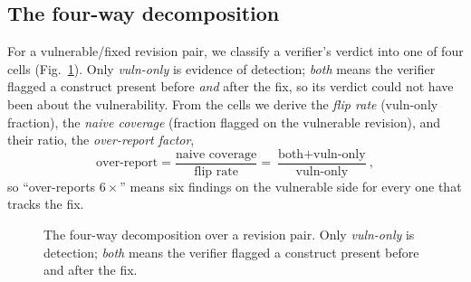 \documentclass[conference]{IEEEtran}
\begin{document}
\subsection{The four-way decomposition}
For a vulnerable/fixed revision pair, we classify a verifier's verdict into one of
four cells (Fig.~\ref{fig:cells}). Only \emph{vuln-only} is evidence of detection;
\emph{both} means the verifier flagged a construct present before \emph{and} after
the fix, so its verdict could not have been about the vulnerability. From the cells
we derive the \emph{flip rate} (vuln-only fraction), the \emph{naive coverage}
(fraction flagged on the vulnerable revision), and their ratio, the \emph{over-report
factor},
\begin{equation}
\text{over-report} = \frac{\text{naive coverage}}{\text{flip rate}}
                    = \frac{\text{both} + \text{vuln-only}}{\text{vuln-only}},
\end{equation}
so ``over-reports $6\times$'' means six findings on the vulnerable side for
every one that tracks the fix.

\begin{figure}[t]
\centering
{}
\caption{The four-way decomposition over a revision pair. Only \emph{vuln-only} is
detection; \emph{both} means the verifier flagged a construct present before and
after the fix.}
\label{fig:cells}
\end{figure}
\end{document}
